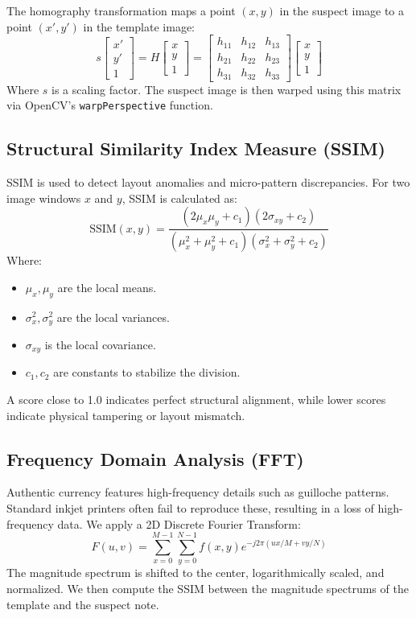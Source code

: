 \documentclass[12pt,a4paper]{article}
\begin{document}
The homography transformation maps a point $(x, y)$ in the suspect image to a point $(x', y')$ in the template image:
\begin{equation}
s \begin{bmatrix} x' \\ y' \\ 1 \end{bmatrix} = H \begin{bmatrix} x \\ y \\ 1 \end{bmatrix} = \begin{bmatrix} h_{11} & h_{12} & h_{13} \\ h_{21} & h_{22} & h_{23} \\ h_{31} & h_{32} & h_{33} \end{bmatrix} \begin{bmatrix} x \\ y \\ 1 \end{bmatrix}
\end{equation}
Where $s$ is a scaling factor. The suspect image is then warped using this matrix via OpenCV's \texttt{warpPerspective} function.

\subsection{Structural Similarity Index Measure (SSIM)}
SSIM is used to detect layout anomalies and micro-pattern discrepancies. For two image windows $x$ and $y$, SSIM is calculated as:
\begin{equation}
\text{SSIM}(x,y) = \frac{(2\mu_x\mu_y + c_1)(2\sigma_{xy} + c_2)}{(\mu_x^2 + \mu_y^2 + c_1)(\sigma_x^2 + \sigma_y^2 + c_2)}
\end{equation}
Where:
\begin{itemize}
    \item $\mu_x, \mu_y$ are the local means.
    \item $\sigma_x^2, \sigma_y^2$ are the local variances.
    \item $\sigma_{xy}$ is the local covariance.
    \item $c_1, c_2$ are constants to stabilize the division.
\end{itemize}
A score close to 1.0 indicates perfect structural alignment, while lower scores indicate physical tampering or layout mismatch.

\subsection{Frequency Domain Analysis (FFT)}
Authentic currency features high-frequency details such as guilloche patterns. Standard inkjet printers often fail to reproduce these, resulting in a loss of high-frequency data. We apply a 2D Discrete Fourier Transform:
\begin{equation}
F(u,v) = \sum_{x=0}^{M-1} \sum_{y=0}^{N-1} f(x,y) e^{-j2\pi(ux/M + vy/N)}
\end{equation}
The magnitude spectrum is shifted to the center, logarithmically scaled, and normalized. We then compute the SSIM between the magnitude spectrums of the template and the suspect note.
\end{document}
